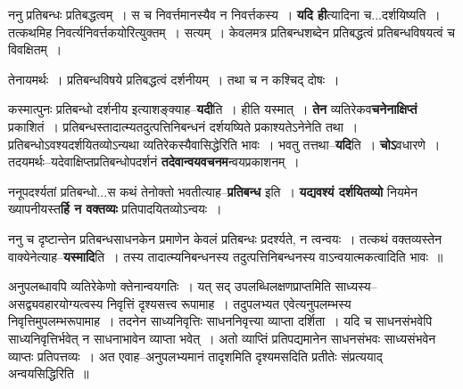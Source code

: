 \documentclass[article,12pt,a4paper]{memoir}
\begin{document}
	  \pstart ननु प्रतिबन्धः प्रतिबद्धत्वम् । स च निवर्त्तमानस्यैव न निवर्त्तकस्य । \textbf{यदि ही}त्यादिना च...दर्शयिष्यति । तत्कथमिह निवर्त्यनिवर्त्तकयोरित्युक्तम् । सत्यम् । केवलमत्र प्रतिबन्धशब्देन प्रतिबद्धत्वं प्रतिबन्धविषयत्वं च विवक्षितम् ।
	\pend
      

	  \pstart तेनायमर्थः । प्रतिबन्धविषये प्रतिबद्धत्वं दर्शनीयम् । तथा च न कश्चिद् दोषः ।
	\pend
      

	  \pstart कस्मात्पुनः प्रतिबन्धो दर्शनीय इत्याशङ्क्याह--\textbf{यदी}ति । हीति यस्मात् । \textbf{तेन} व्यतिरेकव\textbf{चनेनाक्षिप्तं} प्रकाशितं । प्रतिबन्धस्तादात्म्यतदुत्पत्तिनिबन्धनं दर्शयष्यिते प्रकाश्यतेऽनेनेति तथा । प्रतिबन्धोऽवश्यदर्शयितव्योऽन्यथा व्यतिरेकस्यैवासिद्धेरिति भावः । भवतु तत्तथा--\textbf{यदि}ति । \textbf{चोऽ}वधारणे । तदयमर्थः--यदेवाक्षिप्तप्रतिबन्धोपदर्शनं \textbf{तदेवान्वयवचनम}न्वयप्रकाशनम् ।
	\pend
      

	  \pstart ननूपदर्श्यतां प्रतिबन्धो...स कथं तेनोक्तो भवतीत्याह--\textbf{प्रतिबन्ध} इति । \textbf{यद्यवश्यं दर्शयितव्यो} नियमेन ख्यापनीयस्त\textbf{र्हि न वक्तव्यः} प्रतिपादयितव्योऽन्वयः ।
	\pend
      

	  \pstart ननु च दृष्टान्तेन प्रतिबन्धसाधनकेन प्रमाणेन केवलं प्रतिबन्धः प्रदर्श्यते, न त्वन्वयः । तत्कथं वक्तव्यस्तेन वाक्येनेत्याह--\textbf{यस्मादि}ति । तस्य तादात्म्यनिबन्धनस्य तदुत्पत्तिनिबन्धनस्य वाऽन्वयात्मकत्वादिति भावः ॥
	\pend
	  \bigskip
	  \begingroup
	

	  \pstart अनुपलब्धावपि व्यतिरेकेणो क्तेनान्वयगतिः । यत् सद् उपलब्धिलक्षणप्राप्तमिति साध्यस्य--असद्व्यवहारयोग्यत्वस्य निवृत्तिं दृश्यसत्त्व रूपामाह । तदुपलभ्यत एवेत्यनुपलम्भस्य निवृत्तिमुपलम्भरूपामाह । तदनेन साध्यनिवृत्तिः साधननिवृत्त्या व्याप्ता दर्शिता । यदि च साधनसंभवेपि साध्यनिवृत्तिर्भवेत् न साधनाभावेन व्याप्ता भवेत् । अतो व्याप्तिं प्रतिपद्यमानेन साधनसंभवः साध्यसंभवेन व्याप्तः प्रतिपत्तव्यः । अत एवाह--अनुपलभ्यमानं तादृशमिति दृश्यमसदिति प्रतीतेः संप्रत्ययाद् अन्वयसिद्धिरिति ॥
	\pend
        
	  \bigskip
	  \begingroup
	
\end{document}
